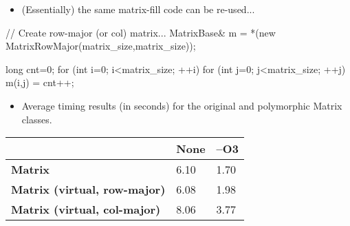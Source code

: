 
\begin{frame}[fragile]
  \begin{itemize}
  \item {(Essentially) the same matrix-fill code can be re-used...}
  \end{itemize}
\small
  \begin{semiverbatim}
// Create row-major (or col) matrix...
MatrixBase\& m = 
  *(new MatrixRowMajor(matrix_size,matrix_size));

long cnt=0;
for (int i=0; i<matrix_size; ++i)
  for (int j=0; j<matrix_size; ++j)
    m(i,j) = cnt++;
  \end{semiverbatim}
\end{frame}


\begin{frame}
  \begin{itemize}
  \item Average timing results (in seconds) for the original and
    polymorphic Matrix classes.
  \end{itemize}
  \begin{center}
  \begin{tabular}{lll} \toprule
                     & \textbf{None} & \textbf{--O3} \\ \midrule
    \textbf{Matrix}                 & 6.10 & 1.70  \\ 
    \textbf{Matrix (virtual, row-major) }       & 6.08 & 1.98  \\ 
    \textbf{Matrix (virtual, col-major) }       & 8.06 & 3.77  \\ \bottomrule

  \end{tabular}
  \end{center}
\end{frame}

